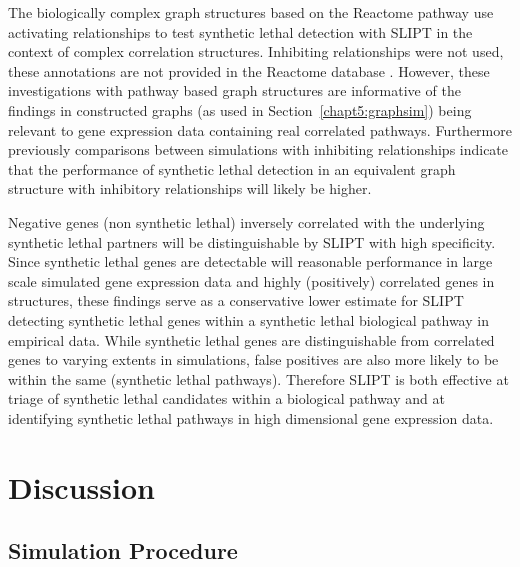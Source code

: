 The biologically complex \gls{graph} structures based on the Reactome pathway use activating relationships to test \gls{synthetic lethal} detection with \gls{SLIPT} in the context of complex correlation structures. Inhibiting relationships were not used, these annotations are not provided in the Reactome database \citep{Reactome}. However, these investigations with pathway based \gls{graph} structures are informative of the findings in constructed \glspl{graph} (as used in Section~\ref{chapt5:graphsim}) being relevant to \gls{gene expression} data containing real correlated pathways. Furthermore previously comparisons between simulations with inhibiting relationships indicate that the performance of \gls{synthetic lethal} detection in an equivalent \gls{graph} structure with inhibitory relationships will likely be higher.

Negative genes (non \gls{synthetic lethal}) inversely correlated with the underlying \gls{synthetic lethal} partners will be distinguishable by \gls{SLIPT} with high specificity. Since \gls{synthetic lethal} genes are detectable will reasonable performance in large scale simulated \gls{gene expression} data and highly (positively) correlated genes in  structures, these findings serve as a conservative lower estimate for \gls{SLIPT} detecting \gls{synthetic lethal} genes within a \gls{synthetic lethal} biological pathway in empirical data. While \gls{synthetic lethal} genes are distinguishable from correlated genes to varying extents in simulations, false positives are also more likely to be within the same (synthetic lethal pathways). Therefore \gls{SLIPT} is both effective at triage of \gls{synthetic lethal} candidates within a biological pathway and at identifying \gls{synthetic lethal} pathways in high dimensional \gls{gene expression} data.


\FloatBarrier

\section{Discussion}

\subsection{Simulation Procedure}

